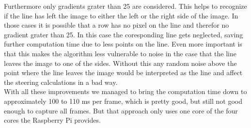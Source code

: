 \documentclass[11pt,twocolumn]{article}
\begin{document}
Furthermore only gradients grater than 25 are considered. This helps to recognize if the line has left the image to either the left or the right side of the image. In those cases it is possible that a row has no pixel on the line and therefor no gradient grater than 25. In this case the coresponding line gets neglected, saving further computation time due to less points on the line. Even more important is that this makes the algorithm less vulnerable to noise in the case that the line leaves the image to one of the sides. Without this any random noise above the point where the line leaves the image would be interpreted as the line and affect the steering calculations in a bad way.\\
With all these improvements we managed to bring the computation time down to approximately 100 to 110 ms per frame, which is pretty good, but still not good enough to capture all frames. But that approach only uses one core of the four cores the Raspberry Pi provides.
\end{document}
